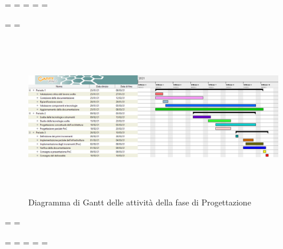 \paperwidth=\pdfpageheight
\paperheight=\pdfpagewidth
\pdfpageheight=\paperheight
\pdfpagewidth=\paperwidth
\headwidth=\textheight

\begingroup 
\vsize=\textwidth
\hsize=\textheight

            \pagestyle{empty}
            \begin{figure}[h]
                \centering	
                \includegraphics[height = 7cm, width = 25cm]{./src/Pianificazione/immagini/gantt_Fase2.png}
                \caption{Diagramma di Gantt delle attività della fase di Progettazione}
            \end{figure}

            
\textwidth=\hsize
\textheight=\vsize

\endgroup
\newpage
\paperwidth=\pdfpageheight
\paperheight=\pdfpagewidth
\pdfpageheight=\paperheight
\pdfpagewidth=\paperwidth
\headwidth=\textwidth